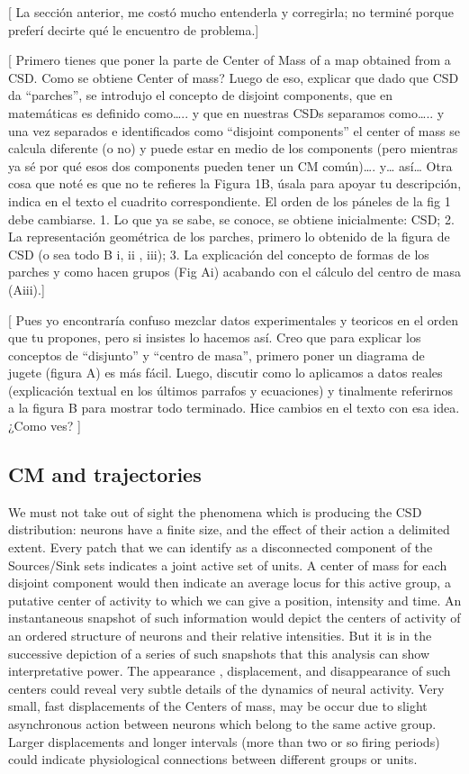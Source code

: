 \documentclass[letterpaper,12pts]{article}
\newcommand{\komment}[1]{{\color{red} [#1]}}
\newcommand{\romment}[1]{{\color{blue} [#1]}}
\begin{document}
\romment{
  La sección anterior, me costó mucho entenderla y corregirla; no terminé porque preferí decirte qué le encuentro de problema.}

\romment{
Primero tienes que poner la parte de Center of Mass of a map obtained from a CSD. Como se obtiene Center of mass?  Luego de eso, explicar que dado que CSD da “parches”, se introdujo el concepto de disjoint components, que en matemáticas es definido como….. y que en nuestras CSDs separamos como….. y una vez separados e identificados como “disjoint components” el center of mass se calcula diferente (o no) y puede estar en medio de los components (pero mientras ya sé por qué esos dos components pueden tener un CM común)…. y… así… 
Otra cosa que noté es que no te refieres la Figura 1B, úsala para apoyar tu descripción, indica en el texto el cuadrito correspondiente. El orden de los páneles de la fig 1 debe cambiarse. 1. Lo que ya se sabe, se conoce, se obtiene inicialmente: CSD; 2. La representación geométrica de los parches, primero lo obtenido de la figura de CSD (o sea todo B i, ii , iii); 3. La explicación del concepto de formas de los parches y como hacen grupos (Fig Ai) acabando con el cálculo del centro de masa (Aiii).}

\komment{ Pues yo encontraría confuso mezclar datos experimentales y teoricos en
  el orden que tu propones, pero si insistes lo hacemos así. Creo que
  para explicar los conceptos de ``disjunto'' y ``centro de masa'', primero
  poner un diagrama de jugete (figura A) es más fácil. Luego, discutir como lo
  aplicamos a datos reales (explicación textual en los
  últimos parrafos y ecuaciones) y tinalmente referirnos a la figura
  B para mostrar todo terminado. Hice cambios en el texto
  con esa idea. ¿Como ves?
  }


\subsection{CM and trajectories}

We must not take out of sight the phenomena which is producing the CSD distribution:
neurons have a finite size, and the effect of their action a delimited extent.
Every patch that we can identify as a disconnected component of the Sources/Sink
sets indicates a joint active set of units. A center of mass for each disjoint
component would then indicate an average locus for this active group, a putative center of activity to which we can give a position, intensity and time. An instantaneous snapshot of such information would depict the centers of activity of an ordered structure of neurons and their relative intensities. But it is in the successive depiction of a series of such snapshots that this analysis can show interpretative power. The appearance , displacement, and disappearance of such centers could reveal very subtle details of the dynamics of neural activity. Very small, fast displacements of the Centers of mass, may be occur due to slight asynchronous action between neurons which belong to the same active group.
Larger displacements and longer intervals (more than two or so firing periods)
could indicate physiological connections between different groups or units.
\end{document}

